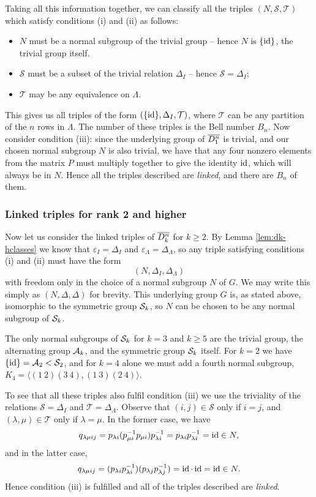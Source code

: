 Taking all this information together, we can classify all the triples $(N,
\mathcal{S}, \mathcal{T})$ which satisfy conditions (i) and (ii) as follows:
\begin{itemize}
\item $N$ must be a normal subgroup of the trivial group -- hence $N$ is
  $\{\operatorname{id}\}$, the trivial group itself.
\item $\mathcal{S}$ must be a subset of the trivial relation $\Delta_I$ -- hence
  $\mathcal{S} = \Delta_I$;
\item $\mathcal{T}$ may be any equivalence on $\Lambda$.
\end{itemize}
This gives us all triples of the form $(\{\operatorname{id}\},\Delta_I,\mathcal{T})$, where
$\mathcal{T}$ can be any partition of the $n$ rows in $\Lambda$.  The number of
these triples is the Bell number $B_n$.  Now consider condition (iii): since the
underlying group of $\overline{D_1^n}$ is trivial, and our chosen normal subgroup $N$ is
also trivial, we have that any four nonzero elements from the matrix $P$ must
multiply together to give the identity $\operatorname{id}$, which will always be in $N$.  Hence all the
triples described are \textit{linked}, and there are $B_n$ of them.

\subsubsection{Linked triples for rank 2 and higher}
\label{sec:k2}
Now let us consider the linked triples of $\overline{D_k^n}$ for $k \geq 2$.  By Lemma
\ref{lem:dk-hclasses} we
know that $\varepsilon_I = \Delta_I$ and $\varepsilon_\Lambda = \Delta_\Lambda$,
so any triple satisfying conditions (i) and (ii) must have the form
$$(N, \Delta_I, \Delta_\Lambda)$$
with freedom only in the choice of a normal subgroup $N$ of $G$.  We may write
this simply as $(N, \Delta, \Delta)$ for brevity.  This
underlying group $G$ is, as stated above, isomorphic to the symmetric group
$\mathcal{S}_k$, so $N$ can be chosen to be any normal subgroup of $\mathcal{S}_k$.

The only normal subgroups of $\mathcal{S}_k$ for $k=3$ and $k \geq 5$ are the trivial group, the
alternating group $\mathcal{A}_k$, and the symmetric group $\mathcal{S}_k$ itself.  For $k=2$ we
have $\{\operatorname{id}\} = \mathcal{A}_2 < \mathcal{S}_2$, and for $k=4$ alone we must add a fourth normal subgroup,
$K_4 = \langle (1~2)(3~4), (1~3)(2~4) \rangle$.

To see that all these triples also fulfil condition (iii) we use the triviality of
the relations $\mathcal{S} = \Delta_I$ and $\mathcal{T} = \Delta_\Lambda$.
Observe that $(i,j) \in \mathcal{S}$ only if $i = j$, and $(\lambda,\mu) \in
\mathcal{T}$ only if $\lambda = \mu$.  In the former case, we have
$$q_{\lambda \mu i j} = p_{\lambda i} (p_{\mu i}^{-1} p_{\mu i}) p_{\lambda
  i}^{-1} = p_{\lambda i} p_{\lambda i}^{-1} = \operatorname{id} \in N,$$
and in the latter case,
$$q_{\lambda \mu i j} = (p_{\lambda i} p_{\lambda i}^{-1}) (p_{\lambda j}
p_{\lambda j}^{-1}) = \operatorname{id} \cdot \operatorname{id} = \operatorname{id} \in N.$$ Hence condition (iii) is fulfilled
and all of the triples described are \textit{linked}.

